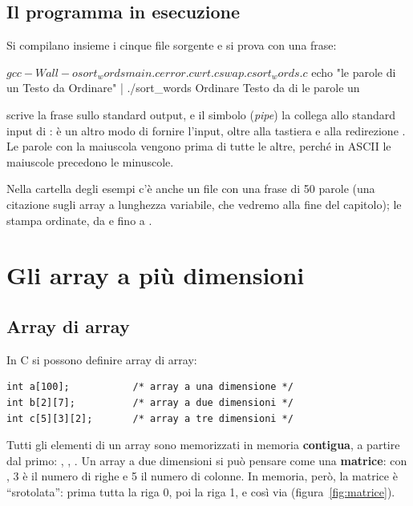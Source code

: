 \subsection{Il programma in esecuzione}

Si compilano insieme i cinque file sorgente e si prova con una frase:

\begin{console}
$ gcc -Wall -o sort_words main.c error.c wrt.c swap.c sort_words.c
$ echo "le parole di un Testo da Ordinare" | ./sort_words
Ordinare
Testo
da
di
le
parole
un
\end{console}

 scrive la frase sullo standard output, e il simbolo \code{|}
(\textit{pipe}) la collega allo standard input di : è un
altro modo di fornire l'input, oltre alla tastiera e alla redirezione
\code{<}. Le parole con la maiuscola vengono prima di tutte le altre, perché
in ASCII le maiuscole precedono le minuscole.

Nella cartella degli esempi c'è anche un file  con una frase
di 50 parole (una citazione sugli array a lunghezza variabile, che vedremo
alla fine del capitolo);  le stampa
ordinate, da  e  fino a .

\section{Gli array a più dimensioni}

\subsection{Array di array}

In C si possono definire array di array:

\begin{lstlisting}[style=c]
int a[100];           /* array a una dimensione */
int b[2][7];          /* array a due dimensioni */
int c[5][3][2];       /* array a tre dimensioni */
\end{lstlisting}

Tutti gli elementi di un array sono memorizzati in memoria
\textbf{contigua}, a partire dal primo: , ,
. Un array a due dimensioni si può pensare come una
\textbf{matrice}: con , 3 è il numero di righe e 5 il
numero di colonne. In memoria, però, la matrice è “srotolata”: prima tutta
la riga 0, poi la riga 1, e così via (figura~\ref{fig:matrice}).

